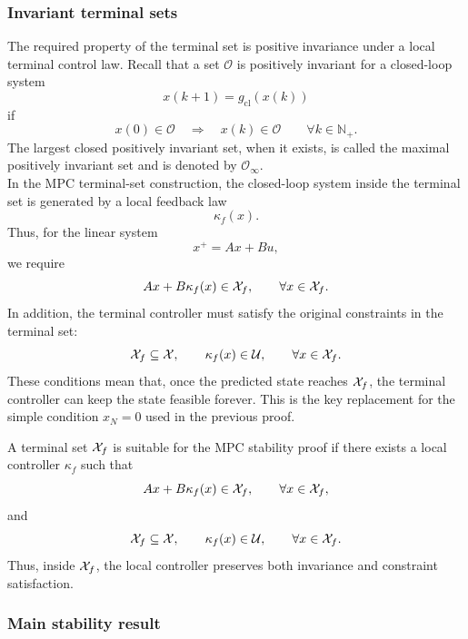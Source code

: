 \subsubsection{Invariant terminal sets}

The required property of the terminal set is positive invariance under a local terminal control
law. Recall that a set \(\mathcal{O}\) is positively invariant for a closed-loop system
\[
    x(k+1)=g_{\mathrm{cl}}(x(k))
\]
if
\[
    x(0)\in\mathcal{O}
    \quad\Longrightarrow\quad
    x(k)\in\mathcal{O}
    \qquad \forall k\in\mathbb{N}_+.
\]
The largest closed positively invariant set, when it exists, is called the maximal positively
invariant set and is denoted by \(\mathcal{O}_\infty\).\\
In the MPC terminal-set construction, the closed-loop system inside the terminal set is generated
by a local feedback law
\[
    \kappa_f(x).
\]
Thus, for the linear system
\[
    x^+ = Ax+B u,
\]
we require
\[
    Ax+B\kappa_f(x)\in\mathcal{X}_f,
    \qquad \forall x\in\mathcal{X}_f.
\]
In addition, the terminal controller must satisfy the original constraints in the terminal set:
\[
    \mathcal{X}_f\subseteq \mathcal{X},
    \qquad
    \kappa_f(x)\in\mathcal{U},
    \qquad \forall x\in\mathcal{X}_f.
\]
These conditions mean that, once the predicted state reaches \(\mathcal{X}_f\), the terminal controller
can keep the state feasible forever. This is the key replacement for the simple condition
\(x_N=0\) used in the previous proof.

\begin{theorembox}
A terminal set \(\mathcal{X}_f\) is suitable for the MPC stability proof if there exists a local controller
\(\kappa_f\) such that
\[
    Ax+B\kappa_f(x)\in\mathcal{X}_f,
    \qquad \forall x\in\mathcal{X}_f,
\]
and
\[
    \mathcal{X}_f\subseteq\mathcal{X},
    \qquad
    \kappa_f(x)\in\mathcal{U},
    \qquad \forall x\in\mathcal{X}_f.
\]
Thus, inside \(\mathcal{X}_f\), the local controller preserves both invariance and constraint satisfaction.
\end{theorembox}

\subsubsection{Main stability result}


